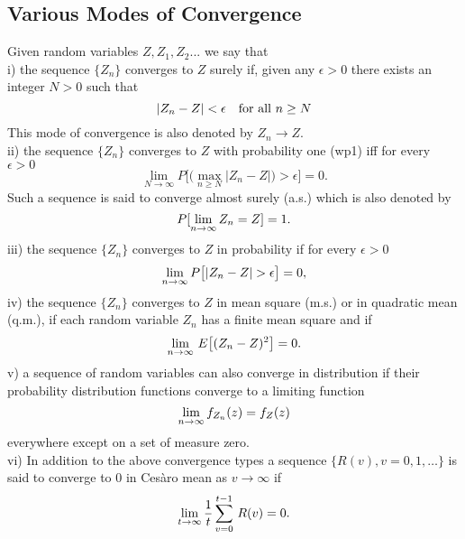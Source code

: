 \subsection{Various Modes of Convergence}
\label{sec:convergence}
Given random variables $Z, Z_1, Z_2 ...$ we say that \\

i) the sequence $\{Z_n\}$ converges to $Z$ {\elevenit surely}\/ if, given any $\epsilon > 0$ there exists an integer $N > 0$ such that
$$ | Z_n - Z | < \epsilon\quad\hbox{for all $n\ge N$}$$ This mode of convergence is also denoted by  $Z_n \rightarrow Z.$ \\

ii) the sequence $\{Z_n\}$ converges to $Z$ {\elevenit with probability one}\/ (wp1) iff for every $\epsilon>0$
$$\lim_{N \to \infty} P\Big[\Big(\max_{n\ge N} |Z_n - Z| \Big) > \epsilon \Big] = 0.$$ Such a sequence is said to converge {\elevenit almost surely}\/ (a.s.) which is also denoted by     
$$P[\lim_{n\rightarrow\infty} Z_n = Z] = 1.$$
iii) the sequence $\{Z_n\}$ converges to $Z$ {\elevenit in probability}\/ if for every $\epsilon>0$ $$\lim_{n\rightarrow\infty} P\big[ |Z_n - Z | > \epsilon \big] = 0,$$ 
iv) the sequence $\{Z_n\}$ converges to $Z$ in {\elevenit mean square}\/ (m.s.)  or in {\elevenit quadratic mean}\/ (q.m.), if each random variable $Z_n$ has a finite mean square and if 
$$\lim_{n\rightarrow\infty}\, E\big[ (Z_n - Z)^2 \big] = 0.$$
v) a sequence of random variables can also converge {\elevenit in distribution}\/ if their probability distribution functions converge to a limiting function $$\lim_{n\rightarrow\infty} f_{Z_n}(z) = f_Z(z)$$everywhere except on a set of measure zero.\\

vi) In addition to the above convergence types a sequence $\{ R(v), v=0,1, \hdots \}$ is said to converge to 0 in Ces\`aro mean as $v \to \infty$ if $$\lim_{t\rightarrow\infty} {1\over t}\sum_{v=0}^{t-1}\,R(v) = 0.$$


